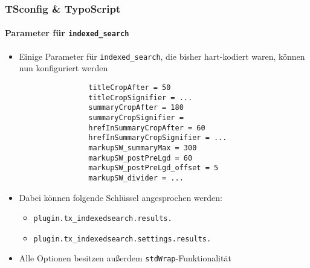 %
\begin{frame}[fragile]
	\frametitle{TSconfig \& TypoScript}
	\framesubtitle{Parameter für \texttt{indexed\_search}}

	\lstset{basicstyle=\tiny\ttfamily}

	\begin{itemize}
		\item Einige Parameter für \texttt{indexed\_search}, die bisher hart-kodiert waren, können nun konfiguriert werden

			\begin{lstlisting}
				titleCropAfter = 50
				titleCropSignifier = ...
				summaryCropAfter = 180
				summaryCropSignifier =
				hrefInSummaryCropAfter = 60
				hrefInSummaryCropSignifier = ...
				markupSW_summaryMax = 300
				markupSW_postPreLgd = 60
				markupSW_postPreLgd_offset = 5
				markupSW_divider = ...
			\end{lstlisting}

		\item Dabei können folgende Schlüssel angesprochen werden:
			\begin{itemize}
				\item \texttt{plugin.tx\_indexedsearch.results.}
				\item \texttt{plugin.tx\_indexedsearch.settings.results.}
			\end{itemize}

		\item Alle Optionen besitzen außerdem \texttt{stdWrap}-Funktionalität

	\end{itemize}

\end{frame}

